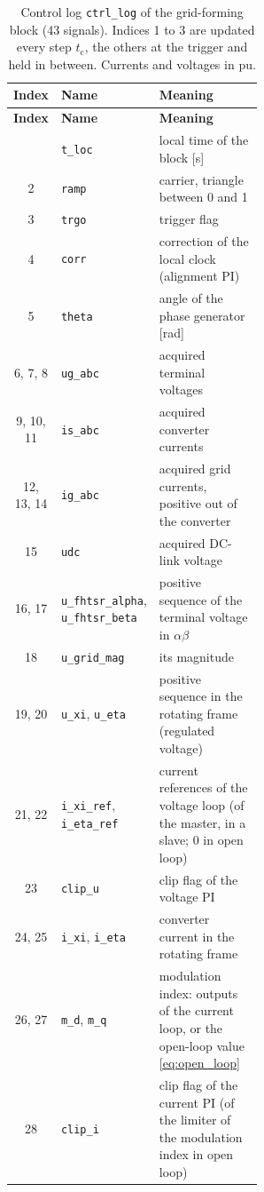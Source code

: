 \documentclass[11pt,a4paper]{scrartcl}
\newcommand{\ped}[1]{_{\mathrm{#1}}}
\newcommand{\code}[1]{\texttt{#1}}
\begin{document}
\begin{onehalfspace}
\small
\begin{longtable}{@{} c l p{0.56\linewidth} @{}}
	\caption[Control log of the grid-forming block.]{Control log \code{ctrl\_log} of the grid-forming block (43 signals). Indices 1 to 3 are updated every step $t\ped{c}$, the others at the trigger and held in between. Currents and voltages in pu.} \label{tab:log_gfm} \\
	\toprule
	\textbf{Index} & \textbf{Name} & \textbf{Meaning} \\
	\midrule
	\endfirsthead
	\toprule
	\textbf{Index} & \textbf{Name} & \textbf{Meaning} \\
	\midrule
	\endhead
	\bottomrule
	\endfoot
	\bottomrule
	\endlastfoot
	1 & \code{t\_loc} & local time of the block [\si{\second}] \\
	2 & \code{ramp} & carrier, triangle between 0 and 1 \\
	3 & \code{trgo} & trigger flag \\
	4 & \code{corr} & correction of the local clock (alignment PI) \\
	5 & \code{theta} & angle of the phase generator [\si{\radian}] \\
	6, 7, 8 & \code{ug\_abc} & acquired terminal voltages \\
	9, 10, 11 & \code{is\_abc} & acquired converter currents \\
	12, 13, 14 & \code{ig\_abc} & acquired grid currents, positive out of the converter \\
	15 & \code{udc} & acquired DC-link voltage \\
	16, 17 & \code{u\_fhtsr\_alpha}, \code{u\_fhtsr\_beta} & positive sequence of the terminal voltage in $\alpha\beta$ \\
	18 & \code{u\_grid\_mag} & its magnitude \\
	19, 20 & \code{u\_xi}, \code{u\_eta} & positive sequence in the rotating frame (regulated voltage) \\
	21, 22 & \code{i\_xi\_ref}, \code{i\_eta\_ref} & current references of the voltage loop (of the master, in a slave; 0 in open loop) \\
	23 & \code{clip\_u} & clip flag of the voltage PI \\
	24, 25 & \code{i\_xi}, \code{i\_eta} & converter current in the rotating frame \\
	26, 27 & \code{m\_d}, \code{m\_q} & modulation index: outputs of the current loop, or the open-loop value \eqref{eq:open_loop} \\
	28 & \code{clip\_i} & clip flag of the current PI (of the limiter of the modulation index in open loop) \\

\end{longtable}
\end{onehalfspace}
\end{document}

